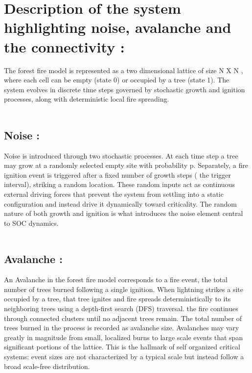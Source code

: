 \documentclass{article}
\begin{document}
\section{Description of the system highlighting noise, avalanche and the connectivity :}
The forest fire model is represented as a two dimensional lattice of size N X N , where each cell can be empty (state 0) or occupied by a tree (state 1). The system evolves in discrete time steps governed by stochastic growth and ignition processes, along with deterministic local fire spreading.\\
\\
\subsection{Noise :} 
Noise is introduced through two stochastic processes. At each time step a tree may grow at a randomly selected empty site with probability p. Separately, a fire ignition event is triggered after a fixed number of growth steps ( the trigger interval), striking a random location. These random inputs act as continuous external driving forces that prevent the system from settling into a static configuration and instead drive it dynamically toward criticality. The random nature of both growth and ignition is what introduces the noise element central to SOC dynamics.\\
\\
\subsection{Avalanche :}
An Avalanche in the forest fire model corresponds to a fire event, the total number of trees burned following a single ignition. When lightning strikes a site occupied by a tree, that tree ignites and fire spreads deterministically to its neighboring trees using a depth-first search (DFS) traversal. the fire continues through connected clusters until no adjacent trees remain. The total number of trees burned in the process is recorded as avalanche size. Avalanches may vary greatly in magnitude from small, localized burns to large scale events that span significant portions of the lattice. This is the hallmark of  self organized critical systems: event sizes are not characterized by a typical scale but instead follow a broad scale-free distribution.\\
\\
\end{document}
